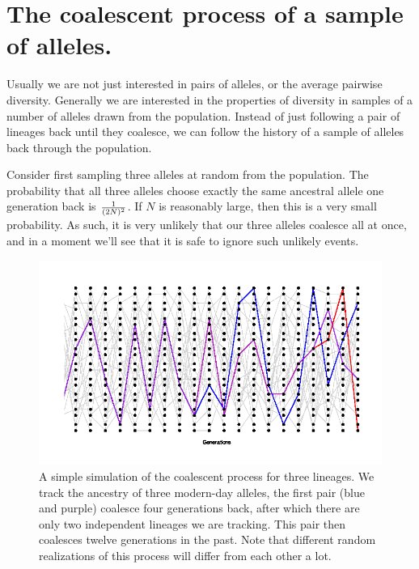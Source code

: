 \section{The coalescent process of a sample of alleles.}

Usually we are not just interested in pairs of alleles, or the
average pairwise diversity. Generally we are interested in the properties of
diversity in samples of a number of alleles drawn from the population.  
Instead of just following a pair of lineages back until they
coalesce, we can follow the history of a sample of alleles back
through the population.

Consider first sampling three alleles at random from the population. The
probability that all three alleles choose exactly the same ancestral allele one
generation back is $\nicefrac{1}{(2N)^2}$. If $N$ is reasonably large, then this
is a very small probability. As such, it is very unlikely that our three alleles
coalesce all at once, and in a moment we'll see that it is safe to ignore such
unlikely events. \\

\begin{figure}
\begin{center}
  \includegraphics[width = \textwidth]{figures/Coalescent_3.png}
\end{center}
\caption{A simple simulation of the coalescent process for three
  lineages. We track the ancestry of 
  three modern-day alleles, the first pair (blue and purple) coalesce four generations back, after which  
  there are only two independent lineages we are tracking. This pair
  then coalesces twelve generations in the past. Note that different
  random realizations of this process will differ from each other a lot.} \label{fig:Coalescent_simulation_3}
\end{figure}

